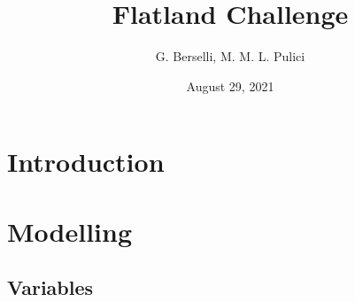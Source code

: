 \documentclass[a4paper, 12pt]{article}
\begin{document}
\title{Flatland Challenge}
\author{G. Berselli, M. M. L. Pulici}
\date{August 29, 2021}
\maketitle
\begin{center}
\end{center}


\clearpage

\tableofcontents

\clearpage

\listoffigures

\clearpage


\section{Introduction}

\clearpage
\section{Modelling}


\subsection{Variables}
\end{document}
